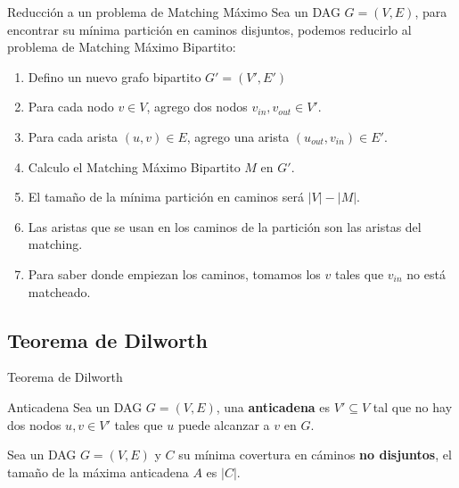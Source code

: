 \documentclass{beamer}
\begin{document}
    \begin{frame}{Reducción a un problema de Matching Máximo}
        Sea un DAG $G = (V,E)$, para encontrar su mínima partición en caminos disjuntos, podemos reducirlo al problema de Matching Máximo Bipartito:
        \begin{enumerate}
            \item Defino un nuevo grafo bipartito $G' = (V', E')$
            \item Para cada nodo $v \in V$, agrego dos nodos $v_{in}, v_{out} \in V'$.
            \pause
            \item Para cada arista $(u,v) \in E$, agrego una arista $(u_{out}, v_{in}) \in E'$. 
            \pause
            \item Calculo el Matching Máximo Bipartito $M$ en $G'$.
            \item El tamaño de la mínima partición en caminos será $|V|-|M|$.
            \pause
            \item Las aristas que se usan en los caminos de la partición son las aristas del matching.
            \item Para saber donde empiezan los caminos, tomamos los $v$ tales que $v_{in}$ no está matcheado.
        \end{enumerate}    
    \end{frame}
\subsection{Teorema de Dilworth}
    \begin{frame}{Teorema de Dilworth}
        \begin{definition}{Anticadena}
            Sea un DAG $G = (V,E)$, una \textbf{anticadena} es $V' \subseteq V$ tal que no hay dos nodos $u,v \in V'$ tales que $u$ puede alcanzar a $v$ en $G$.
        \end{definition}
        
        \pause

        \begin{Theorem}[Dilworth]
            Sea un DAG $G = (V,E)$ y $C$ su mínima covertura en cáminos \textbf{no disjuntos}, el tamaño de la máxima anticadena $A$ es $|C|$.
        \end{Theorem}
        
    \end{frame}
\end{document}
